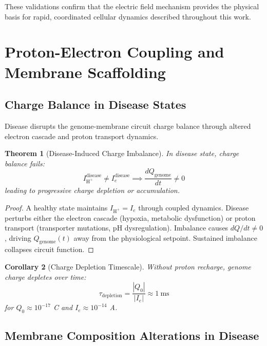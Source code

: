\documentclass[11pt,twocolumn,a4paper]{article}
\newtheorem{theorem}{Theorem}[section]
\newtheorem{corollary}[theorem]{Corollary}
\theoremstyle{definition}
\theoremstyle{remark}
\begin{document}
These validations confirm that the electric field mechanism provides the physical basis for rapid, coordinated cellular dynamics described throughout this work.

\section{Proton-Electron Coupling and Membrane Scaffolding}
\label{sec:proton_electron_coupling}

\subsection{Charge Balance in Disease States}

Disease disrupts the genome-membrane circuit charge balance through altered electron cascade and proton transport dynamics.

\begin{theorem}[Disease-Induced Charge Imbalance]
\label{thm:disease_charge_imbalance}
In disease state, charge balance fails:
\begin{equation}
I_{\text{H}^+}^{\text{disease}} \neq I_e^{\text{disease}} \implies \frac{dQ_{\text{genome}}}{dt} \neq 0
\end{equation}
leading to progressive charge depletion or accumulation.
\end{theorem}

\begin{proof}
A healthy state maintains $I_{\text{H}^+} = I_e$ through coupled dynamics. Disease perturbs either the electron cascade (hypoxia, metabolic dysfunction) or proton transport (transporter mutations, pH dysregulation). Imbalance causes $dQ/dt \neq 0$, driving $Q_{\text{genome}}(t)$ away from the physiological setpoint. Sustained imbalance collapses circuit function.
\end{proof}

\begin{corollary}[Charge Depletion Timescale]
\label{cor:charge_depletion}
Without proton recharge, genome charge depletes over time:
\begin{equation}
\tau_{\text{depletion}} = \frac{|Q_0|}{|I_e|} \approx 1~\text{ms}
\end{equation}
for $Q_0 \approx 10^{-17}$ C and $I_e \approx 10^{-14}$ A.
\end{corollary}

\subsection{Membrane Composition Alterations in Disease}
\end{document}
